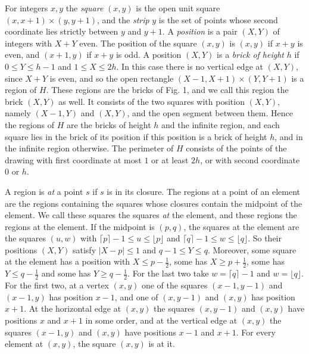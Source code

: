 {For integers $x, y$ the \textit{square} $(x, y)$ is the open unit square $(x, x + 1) \times (y, y + 1)$, and the \textit{strip} $y$ is the set of points whose second coordinate lies strictly between $y$ and $y + 1$. A \textit{position} is a pair $(X, Y)$ of integers with $X + Y$ even. The position of the square $(x, y)$ is $(x, y)$ if $x + y$ is even, and $(x + 1, y)$ if $x + y$ is odd. A position $(X, Y)$ is a \textit{brick of height} $h$ if $0 \le Y \le h - 1$ and $1 \le X \le 2h$. In this case there is no vertical edge at $(X, Y)$, since $X + Y$ is even, and so the open rectangle $(X - 1, X + 1) \times (Y, Y + 1)$ is a region of $H$. These regions are the bricks of Fig. 1, and we call this region the brick $(X, Y)$ as well. It consists of the two squares with position $(X, Y)$, namely $(X - 1, Y)$ and $(X, Y)$, and the open segment between them. Hence the regions of $H$ are the bricks of height $h$ and the infinite region, and each square lies in the brick of its position if this position is a brick of height $h$, and in the infinite region otherwise. The perimeter of $H$ consists of the points of the drawing with first coordinate at most $1$ or at least $2h$, or with second coordinate $0$ or $h$.

A region is \textit{at} a point $s$ if $s$ is in its closure. The regions at a point of an element are the regions containing the squares whose closures contain the midpoint of the element. We call these squares the squares \textit{at} the element, and these regions the regions at the element. If the midpoint is $(p, q)$, the squares at the element are the squares $(u, w)$ with $\lceil p \rceil - 1 \le u \le \lfloor p \rfloor$ and $\lceil q \rceil - 1 \le w \le \lfloor q \rfloor$. So their positions $(X, Y)$ satisfy $|X - p| \le 1$ and $q - 1 \le Y \le q$. Moreover, some square at the element has a position with $X \le p - \frac{1}{2}$, some has $X \ge p + \frac{1}{2}$, some has $Y \le q - \frac{1}{2}$ and some has $Y \ge q - \frac{1}{2}$. For the last two take $w = \lceil q \rceil - 1$ and $w = \lfloor q \rfloor$. For the first two, at a vertex $(x, y)$ one of the squares $(x - 1, y - 1)$ and $(x - 1, y)$ has position $x - 1$, and one of $(x, y - 1)$ and $(x, y)$ has position $x + 1$. At the horizontal edge at $(x, y)$ the squares $(x, y - 1)$ and $(x, y)$ have positions $x$ and $x + 1$ in some order, and at the vertical edge at $(x, y)$ the squares $(x - 1, y)$ and $(x, y)$ have positions $x - 1$ and $x + 1$. For every element at $(x, y)$, the square $(x, y)$ is at it.

}
